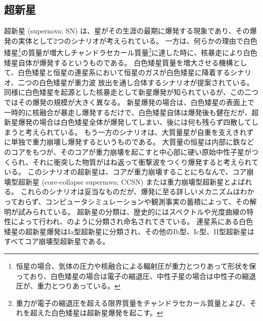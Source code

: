 \subsection{超新星} \label{transients.s1.sn}
超新星 (supernova; SN) は、星がその生涯の最期に爆発する現象であり、その爆発の実体として2つのシナリオが考えられている。
一方は、何らかの理由で白色矮星\footnote{恒星の場合、気体の圧力や核融合による輻射圧が重力とつりあって形状を保っており、白色矮星の場合は電子の縮退圧、中性子星の場合は中性子の縮退圧が、重力とつりあっている。}の質量が増大しチャンドラセカール質量\footnote{重力が電子の縮退圧を超える限界質量をチャンドラセカール質量とよび、それを超えた白色矮星は超新星爆発を起こす。}に達した時に、核暴走により白色矮星自体が爆発するというものである。
白色矮星質量を増大させる機構として、白色矮星と恒星の連星系において恒星のガスが白色矮星に降着するシナリオ、二つの白色矮星が重力波
放出を通し合体するシナリオが提案されている。
同様に白色矮星を起源とした核暴走として新星爆発が知られているが、この二つではその爆発の規模が大きく異なる。
新星爆発の場合は、白色矮星の表面上で一時的に核融合が暴走し爆発するだけで、白色矮星自体は爆発後も健在だが、超新星爆発の場合は白色矮星全体が爆発してしまい、後には何も残らず四散してしまうと考えられている。
もう一方のシナリオは、大質量星が自重を支えきれずに単独で重力崩壊し爆発するというものである。
大質量の恒星は内部に鉄などのコアをもつが、そのコアが重力崩壊を起こすと中心部に硬い原始中性子星がつくられ、それに衝突した物質がはね返って衝撃波をつくり爆発すると考えられている。%
このシナリオの超新星は、コアが重力崩壊することにちなんで、コア崩壊型超新星 (core-collapse supernova; CCSN) または重力崩壊型超新星とよばれる。
これらのシナリオは妥当なものだが、爆発に至る詳しいメカニズムはわかっておらず、コンピュータシミュレーションや観測事実の蓄積によって、その解明が試みられている。
超新星の分類は、歴史的にはスペクトルや光度曲線の特性によって行われ、のように分類され命名されてきている。
連星系にある白色矮星の超新星爆発はIa型超新星に分類され、その他のIb型、Ic型、II型超新星はすべてコア崩壊型超新星である。
